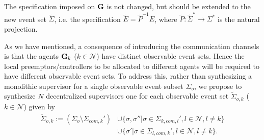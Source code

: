 The specification imposed on $\bf G$ is not changed, but should be extended
to the new event set $\tilde\Sigma$, i.e. the specification
$\tilde{E} = \tilde{P}^{-1} E$,
where $\tilde{P}:\tilde\Sigma^*\rightarrow\Sigma^*$ is the natural projection.


As we have mentioned, a consequence of
introducing the communication channels is that the agents ${\bf G}_k$ ($k \in \mathcal{N}$)
have distinct observable event sets. Hence the local preemptors/controllers to be allocated to different
agents will be required to have different observable event sets. To address this, rather than synthesizing
a monolithic supervisor for a single observable event subset $\Sigma_o$, we propose to synthesize $N$ decentralized
supervisors one for each observable event set $\tilde\Sigma_{o,k}$ ($k \in \mathcal{N}$) given by
\begin{align*}  \tilde\Sigma_{o, k} := ({\Sigma_{o} \setminus \Sigma_{com, k}'} ) &\cup \{\sigma,\sigma''|\sigma \in \Sigma_{k,com,l}', l \in \mathcal{N}, l \neq k\} \\
&\cup \{\sigma'|\sigma \in \Sigma_{l,com,k}', l \in \mathcal{N}, l \neq k\}.
\end{align*}

